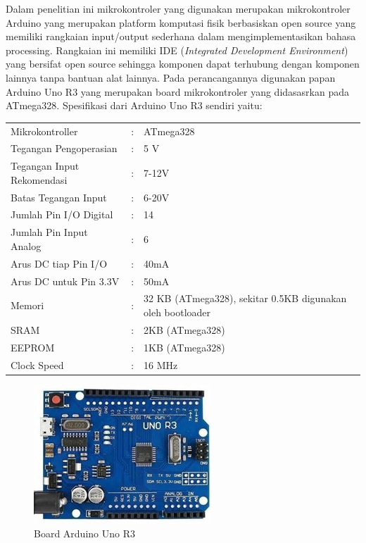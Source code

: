 Dalam penelitian ini mikrokontroler yang digunakan merupakan mikrokontroler Arduino yang merupakan
platform komputasi fisik berbasiskan open source yang memiliki rangkaian input/output sederhana
dalam mengimplementasikan bahasa processing. Rangkaian ini memiliki IDE (\textit{Integrated 
Development Environment}) yang bersifat open source sehingga komponen dapat terhubung dengan
komponen lainnya tanpa bantuan alat lainnya. Pada perancangannya digunakan papan Arduino Uno R3
yang merupakan board mikrokontroler yang didasasrkan pada ATmega328\cite{Sokop2016}. Spesifikasi
dari Arduino Uno R3 sendiri yaitu:
\begin{tabular}{p{6cm}p{3pt}p{6cm}}
    \hspace{20pt} Mikrokontroller &:& ATmega328\\
    \hspace{20pt} Tegangan Pengoperasian &:&5 V\\
    \hspace{20pt} Tegangan Input Rekomendasi &:& 7-12V\\
    \hspace{20pt} Batas Tegangan Input &:& 6-20V\\
    \hspace{20pt} Jumlah Pin I/O Digital &:& 14\\
    \hspace{20pt} Jumlah Pin Input Analog &:& 6\\
    \hspace{20pt} Arus DC tiap Pin I/O &:& 40mA\\
    \hspace{20pt} Arus DC untuk Pin 3.3V &:& 50mA\\
    \hspace{20pt} Memori &:& 32 KB (ATmega328), sekitar 0.5KB digunakan oleh bootloader\\
    \hspace{20pt} SRAM &:& 2KB (ATmega328)\\
    \hspace{20pt} EEPROM &:& 1KB (ATmega328)\\
    \hspace{20pt} Clock Speed &:& 16 MHz
\end{tabular}

\begin{figure}[H]
    \centering
    \includegraphics{Images/ArduinoUno.jpg}
    \caption{Board Arduino Uno R3}
    \label{fig:arduino}
\end{figure}




